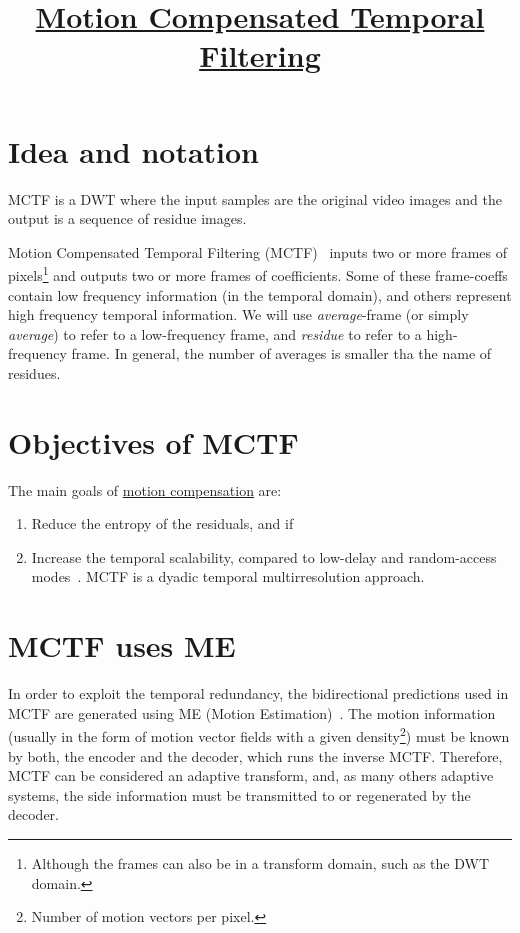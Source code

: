 
\title{\href{https://github.com/vicente-gonzalez-ruiz/MCTF}{Motion Compensated Temporal Filtering}}

\maketitle

\section{Idea and notation}

MCTF is a DWT where the input samples are the original video images
and the output is a sequence of residue images.

Motion Compensated Temporal Filtering (MCTF)~\cite{ohm1994three}
inputs two or more frames of pixels\footnote{Although the frames can
  also be in a transform domain, such as the DWT domain.} and outputs
two or more frames of coefficients. Some of these frame-coeffs contain
low frequency information (in the temporal domain), and others
represent high frequency temporal information. We will use
\emph{average}-frame (or simply \emph{average}) to refer to a
low-frequency frame, and \emph{residue} to refer to a high-frequency
frame. In general, the number of averages is smaller tha the name of
residues.


\section{Objectives of MCTF}

The main goals of
\href{https://en.wikipedia.org/wiki/Motion_compensation}{motion
  compensation} are:
\begin{enumerate}
\item Reduce the entropy of the residuals, and if
\item Increase the temporal scalability, compared to low-delay and
  random-access modes~\cite{vruiz__MC}. MCTF is a
  dyadic temporal multirresolution approach.
\end{enumerate}
  

\section{MCTF uses ME}

In order to exploit the temporal redundancy, the bidirectional
predictions used in MCTF are generated using ME (Motion
Estimation)~\cite{vruiz__ME}. The motion information (usually in the
form of motion vector fields with a given density\footnote{Number of
  motion vectors per pixel.}) must be known by both, the encoder and
the decoder, which runs the inverse MCTF. Therefore, MCTF can be
considered an adaptive transform, and, as many others adaptive
systems, the side information must be transmitted to or regenerated by
the decoder.

